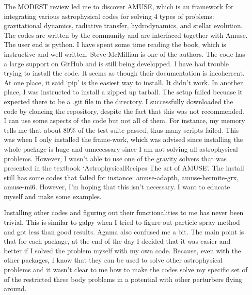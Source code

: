     The MODEST review led me to discover AMUSE, which is an framework for integrating various astrophysical codes for solving 4 types of problems: gravitational dynamics, radiative transfer, hydrodynamics, and stellar evolution. The codes are written by the community and are interfaced together with Amuse. The user end is python. I have spent some time reading the book, which is instructive and well written. Steve McMillian is one of the authors. The code has a large support on GitHub and is still being developped. I have had trouble trying to install the code. It seems as though their documentation is incoherrent. At one place, it said `pip' is the easiest way to install. It didn't work. In another place, I was instructed to install a zipped up tarball. The setup failed becuase it expected there to be a .git file in the directory. I successfully downloaded the code by cloneing the repository, despite the fact that this was not recommended. I can use some aspects of the code but not all of them. For instance, my memory tells me that about 80\% of the test suite passed, thus many scripts failed. This was when I only installed the frame-work, which was advised since installing the whole package is huge and unnecessary since I am not solving all astrophysical problems. However, I wasn't able to use one of the gravity solvers that was presented in the textbook `AstrophysicalRecipes The art of AMUSE'. The install still has some codes that failed for instance: amuse-adaptb, amuse-hermite-grx, amuse-mi6. However, I'm hoping that this isn't necessary. I want to educate myself and make some examples. 

    Installing other codes and figuring out their functionalities to me has never been trivial. This is similar to galpy when I tried to figure out particle spray method and got less than good results. Agama also confused me a bit. The main point is that for each package, at the end of the day I decided that it was easier and better if I solved the problem myself with my own code. Because, even with the other packages, I know that they can be used to solve other astrophysical problems and it wasn't clear to me how to make the codes solve my specific set of of the restricted three body problems in a potential with other perturbers flying around. 

